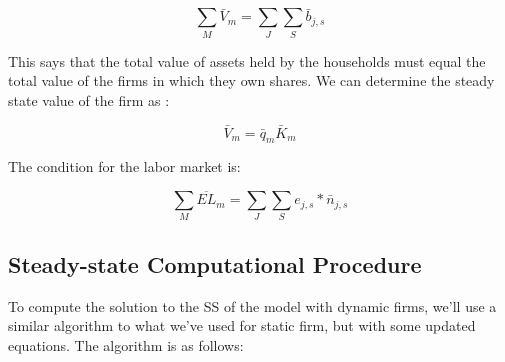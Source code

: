 \documentclass[letterpaper,12pt]{article}
\theoremstyle{definition}
\begin{document}
\begin{spacing}{1.5}
\begin{equation}
\sum_{M} \bar{V}_{m} = \sum_{J}\sum_{S}\bar{b}_{j,s}
\end{equation}

\noindent\noindent This says that the total value of assets held by the households must equal the total value of the firms in which they own shares. We can determine the steady state value of the firm as :

\begin{equation}
\label{eqn:solve_firm_value_ss}
\bar{V}_{m} =\bar{q}_{m}\bar{K}_{m}
\end{equation}

The condition for the labor market is: 

\begin{equation}
\sum_{M} \overline{EL}_{m} = \sum_{J}\sum_{S}e_{j,s}*\bar{n}_{j,s}
\end{equation}

\subsection*{Steady-state Computational Procedure}

To compute the solution to the SS of the model with dynamic firms, we'll use a similar algorithm to what we've used for static firm, but with some updated equations.  The algorithm is as follows:


\end{spacing}
\end{document}

